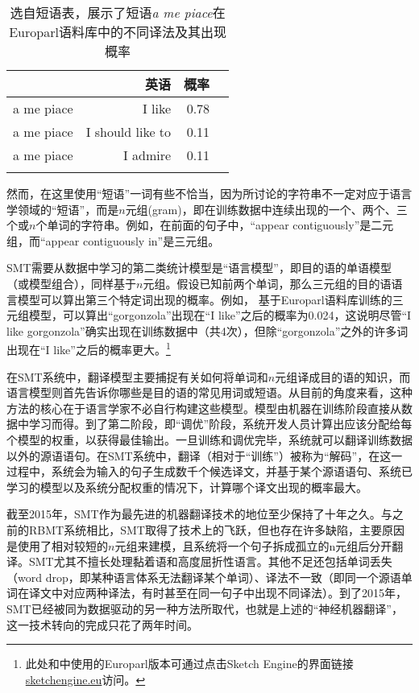 \documentclass[output=paper]{langscibook}
\begin{document}
\begin{table}
\caption{选自短语表，展示了短语\textit{a me piace}在Europarl语料库中的不同译法及其出现概率}
\label{tab:1:n-grams}
 \begin{tabular}{l rrc}
  \lsptoprule
            & 英语 & 概率\\
  \midrule
  a me piace  &   I like  &    0.78\\
  a me piace  &   I should like to  &    0.11\\
  a me piace  &   I admire  &    0.11\\
  \lspbottomrule
 \end{tabular}
\end{table}

然而，在这里使用“短语”一词有些不恰当，因为所讨论的字符串不一定对应于语言学领域的“短语”，而是$n$元组(gram)，即在训练数据中连续出现的一个、两个、三个或$n$个单词的字符串。例如，在前面的句子中，“appear contiguously”是二元组，而“appear contiguously in”是三元组。

SMT需要从数据中学习的第二类统计模型是“语言模型”，即目的语的单语模型（或模型组合），同样基于$n$元组。假设已知前两个单词，那么三元组的目的语语言模型可以算出第三个特定词出现的概率。例如， 基于Europarl语料库训练的三元组模型，可以算出“gorgonzola”出现在“I like”之后的概率为0.024，这说明尽管“I like gorgonzola”确实出现在训练数据中（共4次），但除“gorgonzola”之外的许多词出现在“I like”之后的概率更大。\footnote{此处和中使用的Europarl版本可通过点击Sketch Engine的界面链接\url{sketchengine.eu}访问。}   

在SMT系统中，翻译模型主要捕捉有关如何将单词和$n$元组译成目的语的知识，而语言模型则首先告诉你哪些是目的语的常见用词或短语。从目前的角度来看，这种方法的核心在于语言学家不必自行构建这些模型。模型由机器在训练阶段直接从数据中学习而得。到了第二阶段，即“调优”阶段，系统开发人员计算出应该分配给每个模型的权重，以获得最佳输出。一旦训练和调优完毕，系统就可以翻译训练数据以外的源语语句。在SMT系统中，翻译（相对于“训练”）被称为“解码”，在这一过程中，系统会为输入的句子生成数千个候选译文，并基于某个源语语句、系统已学习的模型以及系统分配权重的情况下，计算哪个译文出现的概率最大。

截至2015年，SMT作为最先进的机器翻译技术的地位至少保持了十年之久。与之前的RBMT系统相比，SMT取得了技术上的飞跃，但也存在许多缺陷，主要原因是使用了相对较短的$n$元组来建模，且系统将一个句子拆成孤立的n元组后分开翻译。SMT尤其不擅长处理黏着语和高度屈折性语言。其他不足还包括单词丢失（word drop，即某种语言体系无法翻译某个单词）、译法不一致（即同一个源语单词在译文中对应两种译法，有时甚至在同一句子中出现不同译法）。到了2015年，SMT已经被同为数据驱动的另一种方法所取代，也就是上述的“神经机器翻译”，这一技术转向的完成只花了两年时间。
\end{document}
